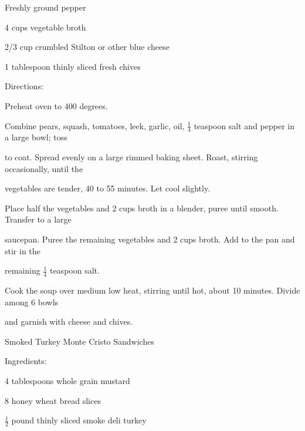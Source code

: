 \documentclass[a4paper,portrait,12pt]{book}
\begin{document}
Freshly ground pepper




4 cups vegetable broth




2/3 cup crumbled Stilton or other blue cheese




1 tablespoon thinly sliced fresh chives




Directions:




Preheat oven to 400 degrees.




Combine pears, squash, tomatoes, leek, garlic, oil, $\frac{1}{4}$ teaspoon salt and pepper in a large bowl; toss




to coat. Spread evenly on a large rimmed baking sheet. Roast, stirring occasionally, until the




vegetables are tender, 40 to 55 minutes. Let cool slightly.




Place half the vegetables and 2 cups broth in a blender, puree until smooth. Transfer to a large




saucepan. Puree the remaining vegetables and 2 cups broth. Add to the pan and stir in the




remaining $\frac{1}{4}$ teaspoon salt.




Cook the soup over medium low heat, stirring until hot, about 10 minutes. Divide among 6 bowls




and garnish with cheese and chives.







\newpage
Smoked Turkey Monte Cristo Sandwiches




Ingredients:




4 tablespoons whole grain mustard




8 honey wheat bread slices




$\frac{1}{2}$ pound thinly sliced smoke deli turkey
\end{document}
